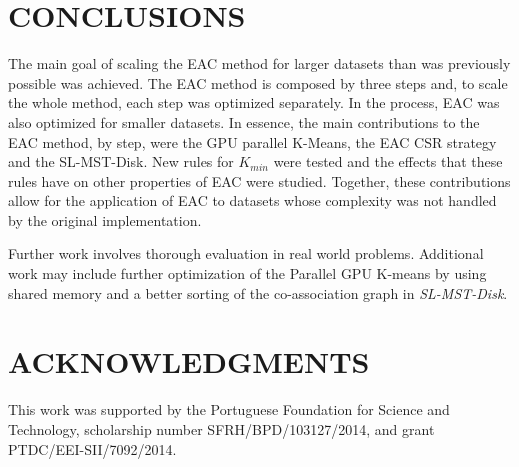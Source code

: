 \section{\uppercase{Conclusions}}
\label{sec:conc}
\noindent The main goal of scaling the EAC method for larger datasets than was previously possible was achieved.
The EAC method is composed by three steps and, to scale the whole method, each step was optimized separately.
In the process, EAC was also optimized for smaller datasets.
In essence, the main contributions to the EAC method, by step, were the GPU parallel K-Means, the EAC CSR strategy and the SL-MST-Disk.
New rules for $K_{min}$ were tested and the effects that these rules have on other properties of EAC were studied.
Together, these contributions allow for the application of EAC to datasets whose complexity was not handled by the original implementation.

Further work involves thorough evaluation in real world problems.
Additional work may include further optimization of the Parallel GPU K-means by using shared memory and a better sorting of the co-association graph in \emph{SL-MST-Disk}.

\section*{\uppercase{Acknowledgments}}
\noindent This work was supported by the Portuguese Foundation for Science and Technology, scholarship number SFRH/BPD/103127/2014, and grant PTDC/EEI-SII/7092/2014.